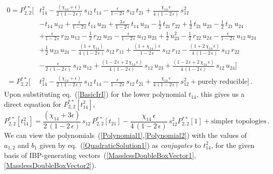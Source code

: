\documentclass[aps,prd,preprint,groupedaddress,nofootinbib,showpacs,eqsecnum]{revtex4}
\def\eqn#1{eq.~(\ref{#1})}
\def\eps{\epsilon}
\def\Pss#1#2{P^{**}_{#1,#2}}
\begin{document}
\begin{equation}
\begin{aligned}
0 = \Pss22\bigl[
&
t_{14}^{2}
-\tfrac{(\chi_{14}+\eps)}{2\,(1-2\,\eps)}\,s_{12}\,t_{14}
-\tfrac{\eps}{1-2\,\eps}\,s_{12}\,t_{21}
+\tfrac{\chi_{14}\,\eps}{4\,(1-2\,\eps)}\,s_{12}^{2}
\\ &
-t_{14}\,u_{12}
+\tfrac{\eps}{1-2\,\eps}\,t_{14}\,u_{23}
+\tfrac{3\,\eps}{1-2\,\eps}\,t_{14}\,u_{24}
-\tfrac{1}{2}\,t_{21}\,r_{22}
+\tfrac{1}{2}\,t_{21}\,u_{23}
-\tfrac{1}{2}\,t_{21}\,u_{24}
\\ &
+\tfrac{\eps}{1-2\,\eps}\,r_{22}\,u_{12}
-\tfrac{1}{2}\,r_{22}\,u_{23}
-\tfrac{\eps}{1-2\,\eps}\,u_{12}\,u_{23}
+\tfrac{1}{2}\,u_{23}^{2}
-\tfrac{1}{2}\,r_{22}\,u_{24}
-\tfrac{\eps}{1-2\,\eps}\,u_{12}\,u_{24}
\\ &
+\tfrac{1}{2}\,u_{23}\,u_{24}
-\tfrac{(1+\chi_{14})}{4\,(1-2\,\eps)}\,s_{12}\,r_{11}
+\tfrac{(1+\chi_{14})\,\eps}{1-2\,\eps}\,s_{12}\,r_{12}
-\tfrac{(1+2\,\chi_{14}\,\eps)}{4\,(1-2\,\eps)}\,s_{12}\,r_{22}
\\ &
-\tfrac{\eps}{2\,(1-2\,\eps)}\,s_{12}\,u_{12}
+\tfrac{(1-2\,\eps+2\,\chi_{14}\,\eps)}{4\,(1-2\,\eps)}\,s_{12}\,u_{23}
+\tfrac{(1-2\,\eps+2\,\chi_{14}\,\eps)}{4\,(1-2\,\eps)}\,s_{12}\,u_{24}
\bigr]\\
= \Pss22\bigl[
&t_{14}^{2}
-\tfrac{(\chi_{14}+\eps)}{2\,(1-2\,\eps)}\,s_{12}\,t_{14}
-\tfrac{\eps}{1-2\,\eps}\,s_{12}\,t_{21}
+\tfrac{\chi_{14}\,\eps}{4\,(1-2\,\eps)}\,s_{12}^{2}
+\textrm{purely\ reducible}\bigr]
\,.
\end{aligned}
\label{QuadraticIBP1}
\end{equation}
Upon substituting \eqn{BasicIrI} for the lower \ideg{} polynomial $t_{14}$,
this gives us a direct equation for $\Pss22[t_{14}^2]$,
\begin{equation}
\Pss22[t_{14}^2] =
\frac{(\chi_{14}+3\eps)}{2\,(1-2\,\eps)}\,s_{12}\,\Pss22[t_{21}]
-\frac{\chi_{14}\,\eps}{4\,(1-2\,\eps)}\,s_{12}^{2}\Pss22[1]
+\textrm{simpler\ topologies}\,.
\end{equation}
We can view the polynomials~(\ref{Polynomial1},\ref{Polynomial2})
with the values of $a_{1,2}$ and $b_1$ given by \eqn{QuadraticSolution1}
as \textit{conjugates\/} to $t_{14}^2$, for the given basis of IBP-generating
vectors~(\ref{MasslessDoubleBoxVector1},\ref{MasslessDoubleBoxVector2}).
\end{document}
